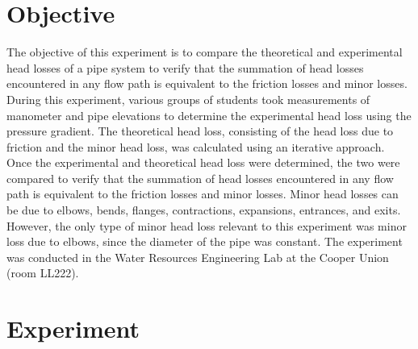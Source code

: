 \documentclass{article}
\begin{document}

\newpage
\doublespacing
\tableofcontents
\newpage
{}
\listoftables
{}
\listoffigures
\newpage
\section{Objective} 
\indent The objective of this experiment is to compare the theoretical and experimental head losses of a pipe system to verify that the summation of head losses encountered in any flow path is equivalent to the friction losses and minor losses. During this experiment, various groups of students took measurements of manometer and pipe elevations to determine the experimental head loss using the pressure gradient. The theoretical head loss, consisting of the head loss due to friction and the minor head loss, was calculated using an iterative approach. Once the experimental and theoretical head loss were determined, the two were compared to verify that the summation of head losses encountered in any flow path is equivalent to the friction losses and minor losses. Minor head losses can be due to elbows, bends, flanges, contractions, expansions, entrances, and exits. However, the only type of minor head loss relevant to this experiment was minor loss due to elbows, since the diameter of the pipe was constant. The experiment was conducted in the Water Resources Engineering Lab at the Cooper Union (room LL222).
\newpage
\section{Experiment}
\end{document}
